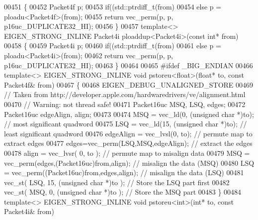 \begin{DoxyCode}
{00451 \{
00452   Packet4f p;
00453   \textcolor{keywordflow}{if}((std::ptrdiff\_t(from) %
00454   \textcolor{keywordflow}{else}                                  p = ploadu<Packet4f>(from);
00455   \textcolor{keywordflow}{return} vec\_perm(p, p, p16uc\_DUPLICATE32\_HI);
00456 \}
00457 \textcolor{keyword}{template}<> EIGEN\_STRONG\_INLINE Packet4i ploaddup<Packet4i>(\textcolor{keyword}{const} \textcolor{keywordtype}{int}*     from)
00458 \{
00459   Packet4i p;
00460   \textcolor{keywordflow}{if}((std::ptrdiff\_t(from) %
00461   \textcolor{keywordflow}{else}                                  p = ploadu<Packet4i>(from);
00462   \textcolor{keywordflow}{return} vec\_perm(p, p, p16uc\_DUPLICATE32\_HI);
00463 \}
00464 
00465 \textcolor{preprocessor}{#ifdef \_BIG\_ENDIAN}
00466 \textcolor{keyword}{template}<> EIGEN\_STRONG\_INLINE \textcolor{keywordtype}{void} pstoreu<float>(\textcolor{keywordtype}{float}*  to, \textcolor{keyword}{const} Packet4f& from)
00467 \{
00468   EIGEN\_DEBUG\_UNALIGNED\_STORE
00469   \textcolor{comment}{// Taken from http://developer.apple.com/hardwaredrivers/ve/alignment.html}
00470   \textcolor{comment}{// Warning: not thread safe!}
00471   Packet16uc MSQ, LSQ, edges;
00472   Packet16uc edgeAlign, align;
00473 
00474   MSQ = vec\_ld(0, (\textcolor{keywordtype}{unsigned} \textcolor{keywordtype}{char} *)to);                     \textcolor{comment}{// most significant quadword}
00475   LSQ = vec\_ld(15, (\textcolor{keywordtype}{unsigned} \textcolor{keywordtype}{char} *)to);                    \textcolor{comment}{// least significant quadword}
00476   edgeAlign = vec\_lvsl(0, to);                              \textcolor{comment}{// permute map to extract edges}
00477   edges=vec\_perm(LSQ,MSQ,edgeAlign);                        \textcolor{comment}{// extract the edges}
00478   align = vec\_lvsr( 0, to );                                \textcolor{comment}{// permute map to misalign data}
00479   MSQ = vec\_perm(edges,(Packet16uc)from,align);             \textcolor{comment}{// misalign the data (MSQ)}
00480   LSQ = vec\_perm((Packet16uc)from,edges,align);             \textcolor{comment}{// misalign the data (LSQ)}
00481   vec\_st( LSQ, 15, (\textcolor{keywordtype}{unsigned} \textcolor{keywordtype}{char} *)to );                   \textcolor{comment}{// Store the LSQ part first}
00482   vec\_st( MSQ, 0, (\textcolor{keywordtype}{unsigned} \textcolor{keywordtype}{char} *)to );                    \textcolor{comment}{// Store the MSQ part}
00483 \}
00484 \textcolor{keyword}{template}<> EIGEN\_STRONG\_INLINE \textcolor{keywordtype}{void} pstoreu<int>(\textcolor{keywordtype}{int}*      to, \textcolor{keyword}{const} Packet4i& from)
}
\end{DoxyCode}
